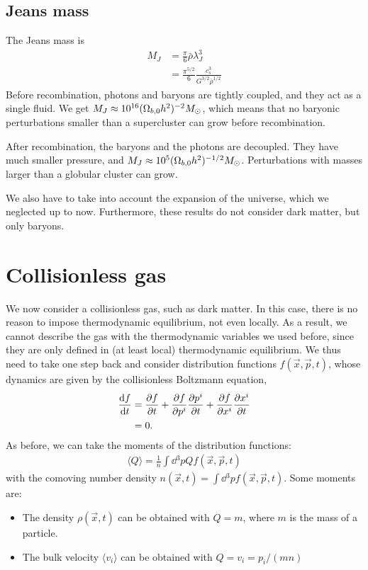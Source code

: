 
\subsection*{Jeans mass}
The Jeans mass is
\begin{align*}
	M_J
	&= \frac{\pi}{6} \bar{\rho} \lambda_J^3\\
	&= \frac{\pi^{5/2}}{6} \frac{c_s^3}{G^{3/2} \bar{\rho}^{1/2}}
\end{align*}
Before recombination, photons and baryons are tightly coupled, and they act as a single fluid. We get $M_J \approx \num{e16} (\Omega_{b,0}h^2)^{-2} M_\odot$, which means that no baryonic perturbations smaller than a supercluster can grow before recombination.

After recombination, the baryons and the photons are decoupled. They have much smaller pressure, and $M_J \approx \num{e5} (\Omega_{b,0}h^2)^{-1/2} M_\odot$. Perturbations with masses larger than a globular cluster can grow.

We also have to take into account the expansion of the universe, which we neglected up to now. Furthermore, these results do not consider dark matter, but only baryons.


\section{Collisionless gas}
We now consider a collisionless gas, such as dark matter. In this case, there is no reason to impose thermodynamic equilibrium, not even locally. As a result, we cannot describe the gas with the thermodynamic variables we used before, since they are only defined in (at least local) thermodynamic equilibrium. We thus need to take one step back and consider distribution functions $f(\vec{x}, \vec{p}, t)$, whose dynamics are given by the collisionless Boltzmann equation,
\begin{align*}
	\dv{f}{t}
	&= \pdv{f}{t} + \pdv{f}{p^i} \pdv{p^i}{t} + \pdv{f}{x^i} \pdv{x^i}{t}\\
	&= 0.
\end{align*}
As before, we can take the moments of the distribution functions:
\begin{align*}
	\langle Q \rangle = \frac{1}{n} \int \dd{^3p} Q f(\vec{x}, \vec{p}, t)
\end{align*}
with the comoving number density $n(\vec{x}, t) = \int \dd{^3p} f(\vec{x}, \vec{p}, t)$. Some moments are:
\begin{itemize}
	\item The density $\rho(\vec{x}, t)$ can be obtained with $Q = m$, where $m$ is the mass of a particle.
	\item The bulk velocity $\langle v_i \rangle$ can be obtained with $Q = v_i = p_i/(m n)$
\end{itemize}

